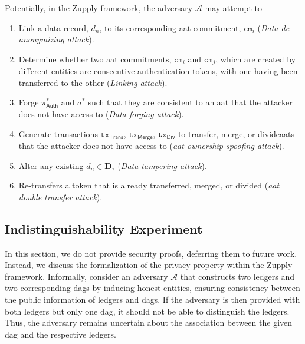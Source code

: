Potentially, in the Zupply framework, the adversary $\mathcal{A}$ may attempt to 

        \begin{enumerate}        
	
	\item Link a data record, $d_n$, to its corresponding \gls{aat} commitment, $\texttt{cm}_i$ (\textit{Data de-anonymizing attack}).
	
	
	\item Determine whether two \gls{aat} commitments, $\texttt{cm}_i$ and $\texttt{cm}_j$, which are created by different entities are consecutive authentication tokens, with one having been transferred to the other (\textit{Linking attack}).
	
	\item
	Forge $\pi_\mathsf{Auth}^\ast$ and $\sigma^\ast$ such that they are consistent to an \gls{aat} that the attacker does not have access to (\textit{Data forging attack}). 
	
	
	\item
	Generate transactions $\texttt{tx}_\mathsf{Trans}$, $\texttt{tx}_\mathsf{Merge}$, $\texttt{tx}_\mathsf{Div}$ to  transfer, merge, or divide\gls{aat}s that the attacker does not have access to (\textit{\gls{aat} ownership spoofing attack}).
	
	
	\item
	Alter any existing $d_{n} \in \mathbf{D}_\tau$ (\textit{Data tampering attack}).
	
	\item
	 Re-transfers a token that is already transferred, merged, or divided (\textit{\gls{aat} double transfer attack}).
\end{enumerate}



\subsection{Indistinguishability Experiment} \label{sec:ind_experiment}
In this section, we do not provide security proofs, deferring them to future work.
Instead, we discuss the formalization of the privacy property within the Zupply framework. Informally, consider an adversary $\mathcal{A}$ that constructs two ledgers and two corresponding \glspl{dag} by inducing honest entities, ensuring consistency between the public information of  ledgers and \gls{dag}s. If the adversary is then provided with both ledgers but only one \gls{dag}, it should not be able to distinguish the ledgers. Thus, the adversary remains uncertain about the association between the given \gls{dag} and the respective ledgers.


